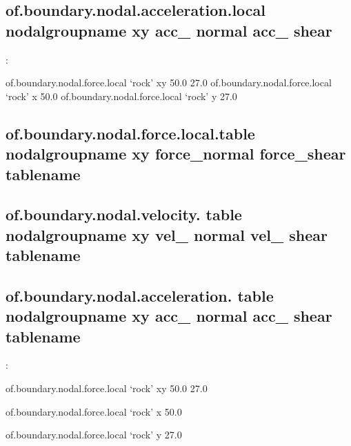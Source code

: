 \documentclass[letterpaper,10pt,english]{sphinxmanual}
\begin{document}
\subsection{of.boundary.nodal.acceleration.local nodalgroupname xy acc\_ normal acc\_ shear}
\label{\detokenize{rst_tutorials/command_line_guide:of-boundary-nodal-acceleration-local-nodalgroupname-xy-acc-normal-acc-shear}}
:

\begin{sphinxVerbatim}[commandchars=\\\{\}]
of.boundary.nodal.force.local ‘rock’ xy \PYGZhy{}50.0 27.0
of.boundary.nodal.force.local ‘rock’ x \PYGZhy{}50.0
of.boundary.nodal.force.local ‘rock’ y 27.0
\end{sphinxVerbatim}


\subsection{of.boundary.nodal.force.local.table nodalgroupname xy force\_normal force\_shear tablename}
\label{\detokenize{rst_tutorials/command_line_guide:of-boundary-nodal-force-local-table-nodalgroupname-xy-force-normal-force-shear-tablename}}

\subsection{of.boundary.nodal.velocity. table nodalgroupname xy vel\_ normal vel\_ shear tablename}
\label{\detokenize{rst_tutorials/command_line_guide:of-boundary-nodal-velocity-table-nodalgroupname-xy-vel-normal-vel-shear-tablename}}

\subsection{of.boundary.nodal.acceleration. table nodalgroupname xy acc\_ normal acc\_ shear tablename}
\label{\detokenize{rst_tutorials/command_line_guide:of-boundary-nodal-acceleration-table-nodalgroupname-xy-acc-normal-acc-shear-tablename}}
:

\begin{sphinxVerbatim}[commandchars=\\\{\}]
of.boundary.nodal.force.local ‘rock’ xy \PYGZhy{}50.0 27.0

  of.boundary.nodal.force.local ‘rock’ x \PYGZhy{}50.0

  of.boundary.nodal.force.local ‘rock’ y 27.0
\end{sphinxVerbatim}
\end{document}
